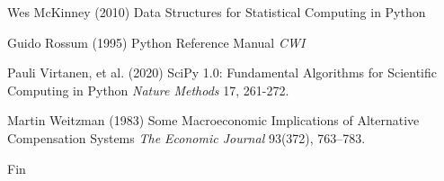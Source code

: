 \documentclass{beamer}
\begin{document}
\begin{frame}[allowframebreaks]
{\begin{thebibliography}{99}
\begin{tiny}
 Wes McKinney (2010)
\newblock Data Structures for Statistical Computing in Python

 Guido Rossum (1995)
\newblock Python Reference Manual
\newblock \emph{CWI}

 Pauli Virtanen, et al. (2020)
\newblock SciPy 1.0: Fundamental Algorithms for Scientific Computing in Python
\newblock \emph{Nature Methods} 17, 261-272.

 Martin Weitzman (1983)
\newblock Some  Macroeconomic  Implications  of  Alternative  Compensation Systems
\newblock \emph{The Economic Journal } 93(372), 763–783.

\end{tiny}
\end{thebibliography}
}
\end{frame}


\begin{frame}
\Huge{\centerline{Fin}}
\end{frame}

\end{document}

